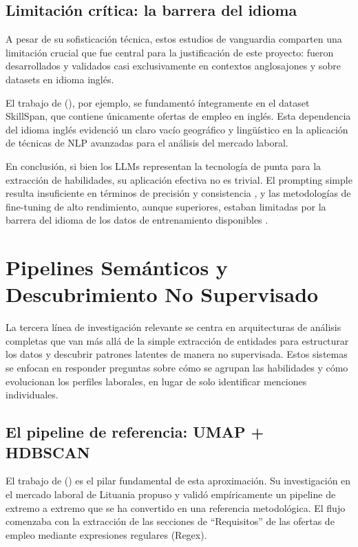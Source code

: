 \subsection{Limitación crítica: la barrera del idioma}

A pesar de su sofisticación técnica, estos estudios de vanguardia comparten una limitación crucial que fue central para la justificación de este proyecto: fueron desarrollados y validados casi exclusivamente en contextos anglosajones y sobre datasets en idioma inglés.

El trabajo de \citeauthor{herandi2024} (\citeyear{herandi2024}), por ejemplo, se fundamentó íntegramente en el dataset SkillSpan, que contiene únicamente ofertas de empleo en inglés. Esta dependencia del idioma inglés evidenció un claro vacío geográfico y lingüístico en la aplicación de técnicas de NLP avanzadas para el análisis del mercado laboral.

En conclusión, si bien los LLMs representan la tecnología de punta para la extracción de habilidades, su aplicación efectiva no es trivial. El prompting simple resulta insuficiente en términos de precisión y consistencia \parencite{nguyen2024}, y las metodologías de fine-tuning de alto rendimiento, aunque superiores, estaban limitadas por la barrera del idioma de los datos de entrenamiento disponibles \parencite{herandi2024}.

\section{Pipelines Semánticos y Descubrimiento No Supervisado}

La tercera línea de investigación relevante se centra en arquitecturas de análisis completas que van más allá de la simple extracción de entidades para estructurar los datos y descubrir patrones latentes de manera no supervisada. Estos sistemas se enfocan en responder preguntas sobre cómo se agrupan las habilidades y cómo evolucionan los perfiles laborales, en lugar de solo identificar menciones individuales.

\subsection{El pipeline de referencia: UMAP + HDBSCAN}

El trabajo de \citeauthor{lukauskas2023} (\citeyear{lukauskas2023}) es el pilar fundamental de esta aproximación. Su investigación en el mercado laboral de Lituania propuso y validó empíricamente un pipeline de extremo a extremo que se ha convertido en una referencia metodológica. El flujo comenzaba con la extracción de las secciones de ``Requisitos'' de las ofertas de empleo mediante expresiones regulares (Regex).

